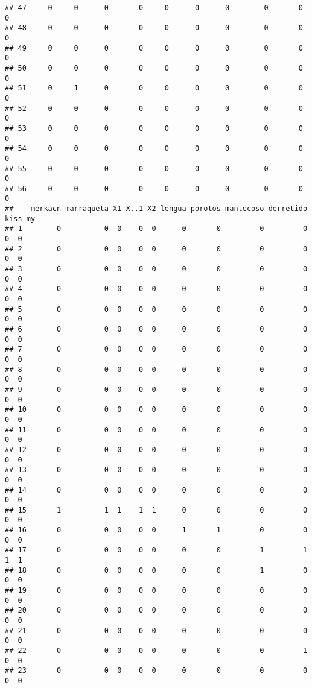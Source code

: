 \documentclass[
]{article}
\begin{document}
\begin{verbatim}
## 47     0     0      0       0     0      0      0        0       0      0
## 48     0     0      0       0     0      0      0        0       0      0
## 49     0     0      0       0     0      0      0        0       0      0
## 50     0     0      0       0     0      0      0        0       0      0
## 51     0     1      0       0     0      0      0        0       0      0
## 52     0     0      0       0     0      0      0        0       0      0
## 53     0     0      0       0     0      0      0        0       0      0
## 54     0     0      0       0     0      0      0        0       0      0
## 55     0     0      0       0     0      0      0        0       0      0
## 56     0     0      0       0     0      0      0        0       0      0
##    merkacn marraqueta X1 X..1 X2 lengua porotos mantecoso derretido kiss my
## 1        0          0  0    0  0      0       0         0         0    0  0
## 2        0          0  0    0  0      0       0         0         0    0  0
## 3        0          0  0    0  0      0       0         0         0    0  0
## 4        0          0  0    0  0      0       0         0         0    0  0
## 5        0          0  0    0  0      0       0         0         0    0  0
## 6        0          0  0    0  0      0       0         0         0    0  0
## 7        0          0  0    0  0      0       0         0         0    0  0
## 8        0          0  0    0  0      0       0         0         0    0  0
## 9        0          0  0    0  0      0       0         0         0    0  0
## 10       0          0  0    0  0      0       0         0         0    0  0
## 11       0          0  0    0  0      0       0         0         0    0  0
## 12       0          0  0    0  0      0       0         0         0    0  0
## 13       0          0  0    0  0      0       0         0         0    0  0
## 14       0          0  0    0  0      0       0         0         0    0  0
## 15       1          1  1    1  1      0       0         0         0    0  0
## 16       0          0  0    0  0      1       1         0         0    0  0
## 17       0          0  0    0  0      0       0         1         1    1  1
## 18       0          0  0    0  0      0       0         1         0    0  0
## 19       0          0  0    0  0      0       0         0         0    0  0
## 20       0          0  0    0  0      0       0         0         0    0  0
## 21       0          0  0    0  0      0       0         0         0    0  0
## 22       0          0  0    0  0      0       0         0         1    0  0
## 23       0          0  0    0  0      0       0         0         0    0  0

\end{verbatim}
\end{document}
